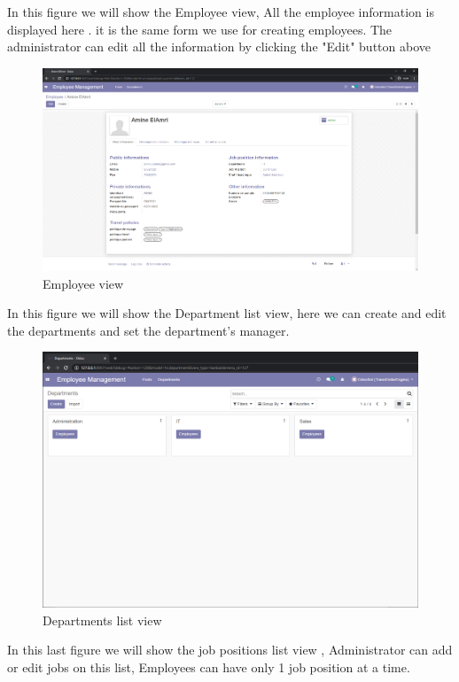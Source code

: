 In this figure we will show the Employee view, All the employee information is displayed here . it is the same form we use for creating employees. The administrator can edit all the information by clicking the "Edit" button above
\begin{figure}[H]
    \centering
    \includegraphics[scale=0.33]{img/c_employee.png}
    \caption{Employee view}
    \label{fig:my_label}
\end{figure}
In this figure we will show the Department list view, here we can create and edit the departments and set the department's manager.
\begin{figure}[H]
    \centering
    \includegraphics[scale=0.44]{img/c_departements.png}
    \caption{Departments list view}
    \label{fig:my_label}
\end{figure}
In this last figure we will show the job positions list view , Administrator can add or edit jobs on this list, Employees can have only 1 job position at a time.
